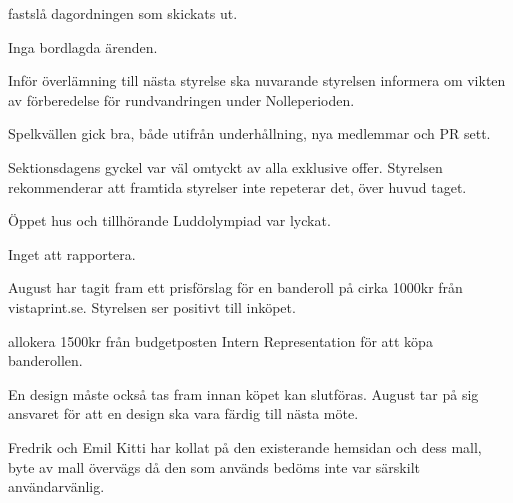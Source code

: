 \documentclass{protokoll}
\begin{document}
\newpage  


\begin{beslut}
     \att fastslå dagordningen som skickats ut.
\end{beslut}

Inga bordlagda ärenden.

Inför överlämning till nästa styrelse ska nuvarande styrelsen informera om vikten av förberedelse för rundvandringen under Nolleperioden. 

Spelkvällen gick bra, både utifrån underhållning, nya medlemmar och PR sett. 

Sektionsdagens gyckel var väl omtyckt av alla exklusive offer. Styrelsen rekommenderar att framtida styrelser inte repeterar det, över huvud taget.

Öppet hus och tillhörande Luddolympiad var lyckat. 


Inget att rapportera.

August har tagit fram ett prisförslag för en banderoll på cirka 1000kr från vistaprint.se. Styrelsen ser positivt till inköpet.
\begin{beslut}
    \att allokera 1500kr från budgetposten Intern Representation för att köpa banderollen.
\end{beslut}
En design måste också tas fram innan köpet kan slutföras. August tar på sig ansvaret för att en design ska vara färdig till nästa möte.

Fredrik och Emil Kitti har kollat på den existerande hemsidan och dess mall, byte av mall övervägs då den som används bedöms inte var särskilt användarvänlig.
\end{document}
